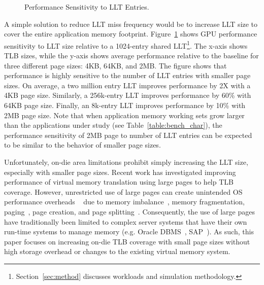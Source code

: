 \begin{figure}[t] 
\vspace{-0.2 in}
\centering
\centerline{}

	\caption{\small Performance Sensitivity to LLT Entries. \normalsize}

\label{fig:tlb_sensitivity} 
\vspace{-0.15 in}
\end{figure}

A simple solution to reduce LLT miss frequency would be to increase
LLT size to cover the entire application memory footprint.
Figure~\ref{fig:tlb_sensitivity} shows GPU performance sensitivity to
LLT size relative to a 1024-entry shared
LLT\footnote{Section~\ref{sec:method} discusses workloads and
simulation methodology.}. The x-axis shows TLB sizes, while the y-axis
shows average performance relative to the baseline for three different
page sizes: 4KB, 64KB, and 2MB. The figure shows that performance is
highly sensitive to the number of LLT entries with smaller page sizes.
On average, a two million entry LLT improves performance by 2X with a
4KB page size. Similarly, a 256k-entry LLT improves performance by
60\% with 64KB page size. Finally, an 8k-entry LLT improves
performance by 10\% with 2MB page size. Note that when application
memory working sets grow larger than the applications under study (see
Table~\ref{table:bench_char}), the performance sensitivity of 2MB page
to number of LLT entries can be expected to be similar to the behavior
of smaller page sizes.


Unfortunately, on-die area limitations prohibit simply increasing the
LLT size, especially with smaller page sizes. Recent work has
investigated improving performance of virtual memory translation using
large pages to help TLB coverage. However, unrestricted use of large
pages can create unintended OS performance overheads
~\cite{SuperPageProblem, TwoPageSize} due to memory
imbalance~\cite{numa-harmful}, memory fragmentation,
paging~\cite{cameo}, page creation, and page
splitting~\cite{largepagevm}. Consequently, the use of large pages
have traditionally been limited to complex server systems that have
their own run-time systems to manage memory (e.g. Oracle
DBMS~\cite{oracle_dbms}, SAP~\cite{sap}). As such, this paper focuses
on increasing on-die TLB coverage with small page sizes without high
storage overhead or changes to the existing virtual memory system.

